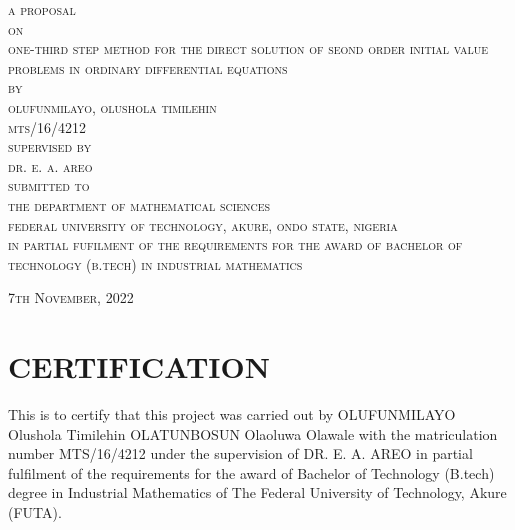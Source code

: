 \documentclass[12pt]{report}
\begin{document}
\begin{titlepage}
	\begin{center}
		\Large \textsc{a proposal}\\
		[5mm]
		\Large \textsc{on}\\
		[5mm]
		\Large \textsc{one-third step method for the direct solution of seond order initial value problems in ordinary differential equations}\\
		[5mm]
		\Large \textsc{by}\\
		[5mm]
		\Large \textsc{olufunmilayo, olushola timilehin \\ mts/16/4212}\\
		[5mm]
		\Large \textsc{supervised by}\\
		\Large \textsc{dr. e. a. areo}\\
		[5mm]
		\Large \textsc{submitted to}\\
		\Large \textsc{the department of mathematical sciences} \\ 
		\Large \textsc{federal university of technology, akure, ondo state, nigeria}\\
		[5mm]
		\Large \textsc{in partial fufilment of the requirements for the award of bachelor of technology (b.tech) in industrial mathematics}\\
		[12mm]
	\end{center}
	
	\begin{flushright}
		\large \textsc{7th November, 2022}
	\end{flushright}

\end{titlepage}

\newpage
{}


    \chapter*{CERTIFICATION}
%
\noindent This is to certify that this project was carried out by OLUFUNMILAYO Olushola Timilehin OLATUNBOSUN Olaoluwa Olawale with the matriculation number MTS/16/4212 under the supervision of DR. E. A. AREO in partial fulfilment of the requirements for the award of Bachelor of Technology (B.tech) degree in Industrial Mathematics of The Federal University of Technology, Akure (FUTA). \\
\\ \\
\end{document}
